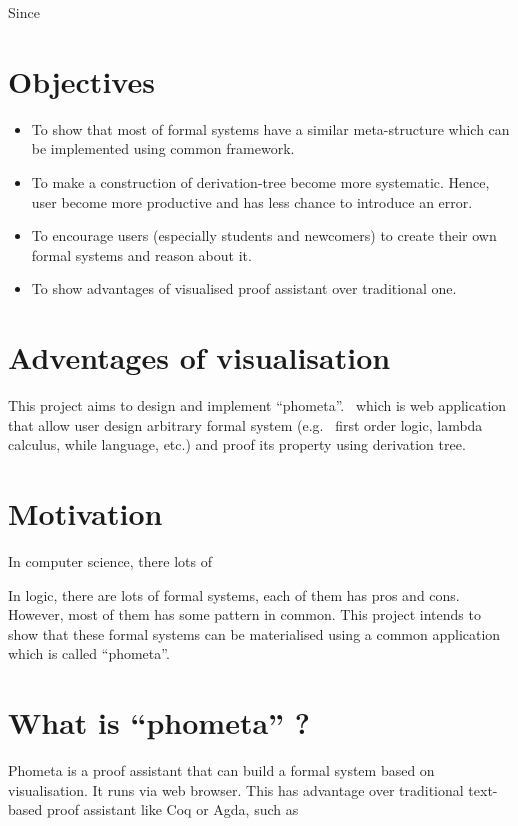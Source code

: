 Since

\section{Objectives}
\begin{itemize}
  \item To show that most of formal systems have a similar meta-structure which can be implemented using common framework.
  \item To make a construction of derivation-tree become more systematic. Hence, user become more productive and has less chance to introduce an error.
  \item To encourage users (especially students and newcomers) to create their own formal systems and reason about it.
  \item To show advantages of visualised proof assistant over traditional one.
\end{itemize}

\section{Adventages of visualisation}

This project aims to design and implement ``phometa''. \ which is web application that allow user design arbitrary formal system (e.g. \ first order logic, lambda calculus, while language, etc.) and proof its property using derivation tree.

\section{Motivation}

In computer science, there lots of

In logic, there are lots of formal systems, each of them has pros and cons. However, most of them has some pattern in common. This project intends to show that these formal systems can be materialised using a common application which is called ``phometa''.

\section{What is ``phometa'' ?}

Phometa is a proof assistant that can build a formal system based on visualisation. It runs via web browser. This has advantage over traditional text-based proof assistant like Coq or Agda, such as

